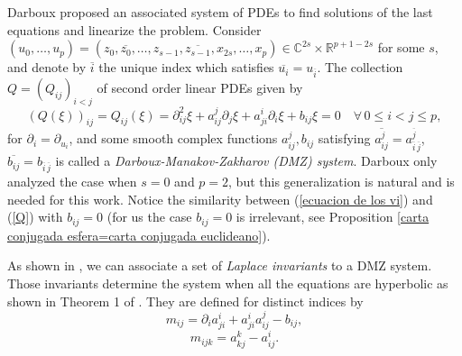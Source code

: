 \documentclass{article}
\theoremstyle{remark}
\begin{document}
Darboux proposed an associated system of PDEs to find solutions of the last equations and linearize the problem. Consider $(u_0,\ldots,u_p)=(z_0,\overline{z_0},\ldots, z_{s-1},\overline{z_{s-1}},x_{2s},\ldots,x_p)\in\mathbb{C}^{2s}\times\mathbb{R}^{p+1-2s}$ for some $s$, and denote by $\overline{i}$ the unique index which satisfies $\overline{u_i}=u_{\overline{i}}$. 
The collection $Q=(Q_{ij})_{i<j}$ of second order linear PDEs given by
\begin{equation}\label{Q}
    (Q(\xi))_{ij}=Q_{ij}(\xi)=\partial^2_{ij}\xi+a_{ij}^j\partial_j\xi+a_{ji}^i\partial_i\xi+b_{ij}\xi=0\quad\forall\, 0\leq i<j\leq p,
\end{equation}
for $\partial_i=\partial_{u_i}$, and some smooth complex functions $a_{ij}^j,b_{ij}$ satisfying $\overline{a_{ij}^j}=a_{\overline{i}\,\overline{j}}^{\overline{j}}$, $\overline{b_{ij}}=b_{\overline{i}\,\overline{j}}$ is called a {\it Darboux-Manakov-Zakharov (DMZ) system}. Darboux only analyzed the case when $s=0$ and $p=2$, but this generalization is natural and is needed for this work. Notice the similarity between (\ref{ecuacion de los vi}) and (\ref{Q}) with $b_{ij}=0$ (for us the case $b_{ij}=0$ is irrelevant, see Proposition \ref{carta conjugada esfera=carta conjugada euclideano}).

As shown in \cite{KT}, we can associate a set of {\it Laplace invariants} to a DMZ system. Those invariants determine the system when all the equations are hyperbolic as shown in Theorem 1 of \cite{KT2}. They are defined for distinct indices by 
$$m_{ij}=\partial_ia_{ji}^i+a_{ji}^ia_{ij}^j-b_{ij},$$
$$m_{ijk}=a_{kj}^k-a_{ij}^i.$$
\end{document}
